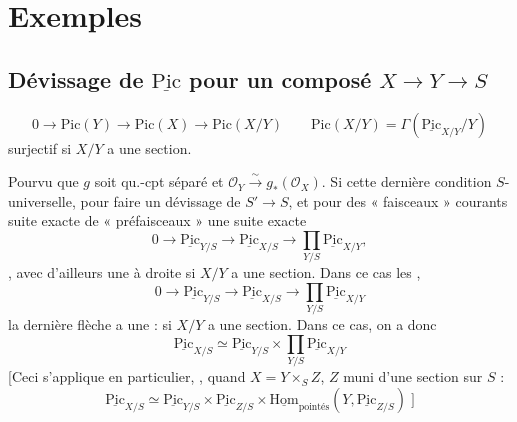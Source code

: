 \documentclass[11pt,a4paper]{article}
\begin{document}
\section{Exemples}

\subsection{Dévissage de $\underline{\mathrm{Pic}}$ pour un composé $X \to Y \to S$}



\[
0 \to \mathrm{Pic}(Y) \to \mathrm{Pic}(X) \to \mathrm{Pic}(X/Y)
\qquad \mathrm{Pic}(X/Y) = \Gamma(\underline{\mathrm{Pic}}_{X/Y}/Y)
\]
surjectif si $X/Y$ a une section.

Pourvu que $g$ soit qu.-cpt séparé et $\mathcal{O}_Y \xrightarrow{\sim} g_*(\mathcal{O}_X)$. Si cette dernière condition  $S$-universelle,  pour faire un dévissage de \ill{}  $S' \to S$, et pour \ill{} des \ill{} \ill{} « faisceaux » courants \ill{} suite exacte de \struck{\ill{}} « préfaisceaux » \ill{} \ill{} une suite exacte
\[
0 \to \underline{\mathrm{Pic}}_{Y/S} \to \underline{\mathrm{Pic}}_{X/S} \to \textstyle\prod_{Y/S} \underline{\mathrm{Pic}}_{X/Y} ,
\]
 , \ill{} \ill{} avec d'ailleurs une   à droite si $X/Y$ a une section. Dans ce cas les  \ill{} , \ill{} \ill{} \ill{}
\[
0 \to \underline{\mathrm{Pic}}_{Y/S} \to \underline{\mathrm{Pic}}_{X/S} \to \textstyle\prod_{Y/S} \underline{\mathrm{Pic}}_{X/Y}
\]
 la dernière flèche a une  : \ill{} \ill{} si $X/Y$ a une section. Dans ce cas, on a donc
\[
\underline{\mathrm{Pic}}_{X/S} \simeq \underline{\mathrm{Pic}}_{Y/S} \times \textstyle\prod_{Y/S} \underline{\mathrm{Pic}}_{X/Y}
\]
[Ceci s'applique en particulier,  \ill{}, quand $X = Y \times_S Z$, $Z$ muni d'une section sur $S$ :
\[
\underline{\mathrm{Pic}}_{X/S} \simeq \underline{\mathrm{Pic}}_{Y/S} \times \underline{\mathrm{Pic}}_{Z/S} \times \underline{\mathrm{Hom}}_{\text{pointés}}(Y, \underline{\mathrm{Pic}}_{Z/S}) \;]
\]
\end{document}
